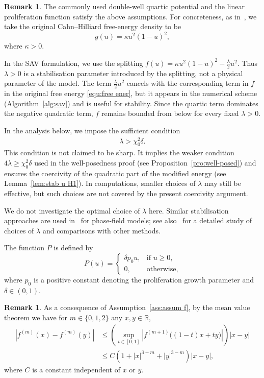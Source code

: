 \documentclass[11pt, reqno]{amsart}
\theoremstyle{definition}
\newtheorem{remark}[theorem]{Remark}
\numberwithin{equation}{section}
\newcommand{\bb}{\mathbb}
\newcommand{\abs}[1]{\left|{#1}\right|}
\begin{document}
\begin{remark}\label{rem:func f P}
	The commonly used double-well quartic potential and the linear proliferation function satisfy the above assumptions. For concreteness, as in~\cite{HawZeeOde12,WanLinYan25}, we take the original Cahn--Hilliard free-energy density to be
	\[
	g(u)=\kappa u^2(1-u)^2,
	\]
	where $\kappa>0$. {In the SAV formulation, we use the splitting
	$f(u)=\kappa u^2(1-u)^2-\frac{\lambda}{2}u^2$.
	Thus $\lambda>0$ is a stabilisation parameter introduced by the splitting, not a physical parameter of the model. The term $\frac{\lambda}{2}u^2$ cancels with the corresponding term in $f$ in the original free energy \eqref{equ:free ener}, but it appears in the numerical scheme (Algorithm~\ref{alg:sav}) and is useful for stability. Since the quartic term dominates the negative quadratic term, $f$ remains bounded from below for every fixed $\lambda>0$.
	
	In the analysis below, we impose the sufficient condition
	\begin{align}\label{equ:ass lambda begin}
	\lambda>\chi_0^2\delta .
	\end{align}
	This condition is not claimed to be sharp. It implies the weaker condition
	$4\lambda\ge\chi_0^2\delta$ used in the well-posedness proof (see Proposition~\ref{pro:well-posed}) and ensures the
	coercivity of the quadratic part of the modified energy (see Lemma~\ref{lem:stab u H1}). In computations,
	smaller choices of $\lambda$ may still be effective, but such choices are not
	covered by the present coercivity argument.} We do not investigate the optimal
	choice of $\lambda$ here. Similar stabilisation approaches are used in~\cite{HeLiuTan07,SheYan10} for phase-field models; see also~\cite{XuLiWu19} for a detailed study of choices of $\lambda$ and comparisons with other methods.
	
	The function $P$ is defined by
	\begin{equation}\label{equ:P u def}
		P(u)=
		\begin{cases}
			\delta p_0 u, &\text{if $u\geq 0$},
			\\
			0, &\text{otherwise},
		\end{cases}
	\end{equation}
	where $p_0$ is a positive constant denoting the proliferation growth parameter and $\delta\in(0,1)$.
\end{remark}


\begin{remark}
As a consequence of Assumption~\ref{ass:assum f}, by the mean value theorem we have for $m\in \{0,1,2\}$ any $x,y\in\bb{R}$,
\begin{align}
	\label{equ:f prime xy}
	\abs{f^{(m)}(x)-f^{(m)}(y)}
	&\leq
	\left(\sup_{t\in [0,1]} \abs{f^{(m+1)}\big((1-t)x+ty\big)}\right) \abs{x-y}
    \nonumber \\
	&\leq
	C\left(1+\abs{x}^{3-m}+\abs{y}^{3-m}\right) \abs{x-y},
\end{align}
where $C$ is a constant independent of $x$ or $y$.
\end{remark}
\end{document}
